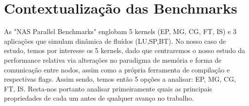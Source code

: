 \documentclass[conference,compsoc]{IEEEtran}
\begin{document}
\section{Contextualização das Benchmarks}
As "NAS Parallel Benchmarks"\cite{nas} englobam 5 kernels (EP, MG, CG, FT, IS) e 3 aplicações  que simulam dinâmica de fluídos (LU,SP,BT). No nosso caso de estudo, temos por interesse os 5 kernels, dado que centraremos o nosso estudo da performance relativa via alterações no paradigma de memória e forma de comunicação entre nodos, assim como a própria ferramenta de compilação e respectivas flags. Assim sendo, temos então 5 opções a analisar: EP, MG, CG, FT, IS. Resta-nos portanto analisar primeiramente quais as principais propriedades de cada um antes de qualquer avanço no trabalho. \par 
\end{document}
